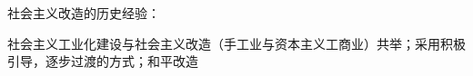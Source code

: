 \begin{notation}
    社会主义改造的历史经验：

    社会主义工业化建设与社会主义改造（手工业与资本主义工商业）共举；采用积极引导，逐步过渡的方式；和平改造
\end{notation}  
